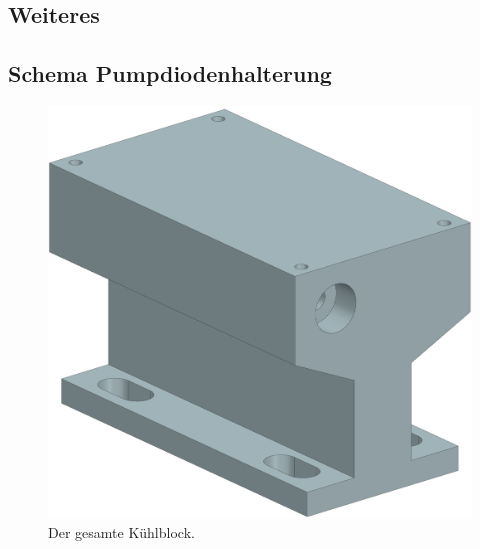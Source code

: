 \begin{appendix}
\section{Weiteres}
\subsection{Schema Pumpdiodenhalterung}
\label{chptr:_pumpdiodenhalterung}

\begin{figure}[H]
    \centering
    \includegraphics[scale=0.35]{98_images/kuehlblock_isometrie.PNG}
    \caption{Der gesamte Kühlblock.}
    \label{fig:enter-label}
\end{figure}


\end{appendix}
